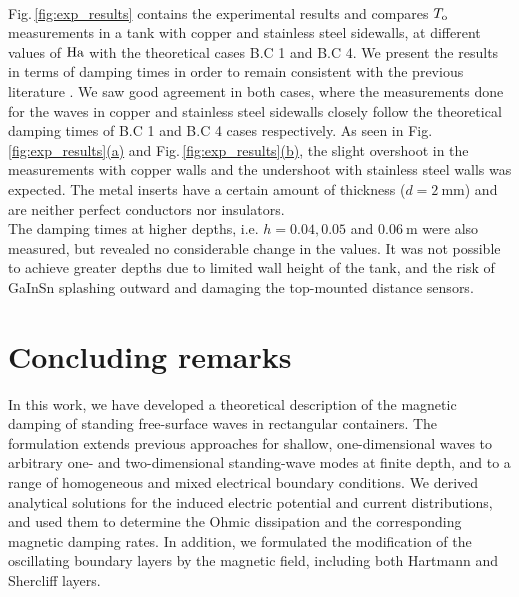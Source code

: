 \documentclass[aps,prfluids,reprint,superscriptaddress]{revtex4-2}
\newcommand{\subref}[2]{\ref{#1}\hyperref[#1]{(#2)}}
\begin{document}
\\
\indent  Fig.\,\ref{fig:exp_results} contains the experimental results and compares $T_{\rm o}$ measurements in a tank with copper and stainless steel sidewalls, at different values of $\rm Ha$ with the theoretical cases B.C 1 and B.C 4. We present the results in terms of damping times in order to remain consistent with the previous literature \cite{Sreenivasan2005}. We saw good agreement in both cases, where the measurements done for the waves in copper and stainless steel sidewalls closely follow the theoretical damping times of B.C 1 and B.C 4 cases respectively. As seen in Fig.\,\subref{fig:exp_results}{a} and Fig.\,\subref{fig:exp_results}{b}, the slight overshoot in the measurements with copper walls and the undershoot with stainless steel walls was expected. The metal inserts have a certain amount of thickness ($d=\SI{2}{\milli\meter}$) and are neither perfect conductors nor insulators.
\\
\indent The damping times at higher depths, i.e. $h=0.04, 0.05$ and $\SI{0.06}{\meter}$ were also measured, but revealed no considerable change in the values. It was not possible to achieve greater depths due to limited wall height of the tank, and the risk of GaInSn splashing outward and damaging the top-mounted distance sensors. 


\section{Concluding remarks}
\label{sec:conclusion}
In this work, we have developed a theoretical description of the magnetic damping of standing free-surface waves in rectangular containers. The formulation extends previous approaches for shallow, one-dimensional waves to arbitrary one- and two-dimensional standing-wave modes at finite depth, and to a range of homogeneous and mixed electrical boundary conditions. We derived analytical solutions for the induced electric potential and current distributions, and used them to determine the Ohmic dissipation and the corresponding magnetic damping rates. In addition, we formulated the modification of the oscillating boundary layers by the magnetic field, including both Hartmann and Shercliff layers.
\end{document}
